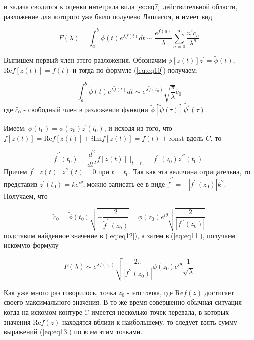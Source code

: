 \documentclass[14pt]{extarticle}
\renewcommand{\Re}{\mathrm{Re}}
\renewcommand{\Im}{\mathrm{Im}}
\newcommand{\const}{\mathrm{const}}
\begin{document}
и задача сводится к оценки интеграла вида $\ref{eq:eq7}$ действительной области, разложение для которого уже было получено Лапласом, и имеет вид\cite{Lavrentyev}

$$
F(\lambda) = \int_{a}^{b}\phi(t)e^{\lambda f(t)}dt \sim \frac{e^{f(a)}}{\lambda}\sum_{n=0}^{\infty}\frac{n! c_n}{\lambda^n}
$$
  
Выпишем первый член этого разложения. Обозначим $\phi[z(t)]z^\prime = \widetilde{\phi}(t)$, $\Re f[z(t)] = \widetilde{f}(t)$ и тогда по формуле (\ref{eq:eq10}) получаем:

\begin{equation}\label{eq:eq12}
\int_{a}^{b} \widetilde{\phi}(t) e^{\lambda \widetilde{f}(t)}dt \sim e^{\lambda \widetilde{f}(t_0)} \sqrt{\frac{\pi}{\lambda}} \widetilde{c_0}
\end{equation}
где $\widetilde{c_0}$ - свободный член в разложении функции $\widetilde{\phi}[\widetilde{\psi}(\tau)]\widetilde{\psi^\prime}(\tau)$.

Имеем: $\widetilde{\phi}(t_0) = \phi(z_0) z^\prime (t_0)$, и исходя из того, что $f[z(t)] = \Re f[z(t)]+ i \Im f[z(t)] = \widetilde{f}(t)+\const$ вдоль $\widetilde{C}$, то

\begin{equation}\nonumber
\widetilde{f}^{\prime\prime} (t_0) = \frac{d^2}{d t^2} f[z(t)]\;|_{t=t_0} = f^{\prime\prime} (z_0) z^{\prime^2} (t_0).
\end{equation}
Причем $f^\prime[z(t)] z^{\prime \prime} (t) = 0$ при $t=t_0$. Так как эта величина отрицательна, то представив $z^\prime (t_0) = k e^{i \theta}$, можно записать ее в виде $\widetilde{f}^{\prime\prime}=-|f^{\prime\prime}(z_0)| k^2$. Получаем, что 

\begin{equation}\nonumber
\widetilde{c}_0=\widetilde{\phi}(t_0) \sqrt{-\frac{2}{\widetilde{f}^{\prime\prime}(z_0)}}= \phi (z_0) e^{i \theta} \sqrt{\frac{2}{|f^{\prime\prime}(z_0)|}}
\end{equation}
подставим найденное значение в (\ref{eq:eq12}), а затем в (\ref{eq:eq11}), получаем искомую формулу

\begin{equation}\label{eq:eq13}
F(\lambda) \sim e^{\lambda f (z_0)}\sqrt{\frac{2\pi}{|f^{\prime \prime} (z_0)|}} \phi(z_0) e^{i \theta} \frac{1}{\sqrt{\lambda}}
\end{equation}

Как уже много раз говорилось, точка $z_0$ - это точка, где $\Re f(z)$ достигает своего максимального значения. В то же время совершенно обычная ситуация - когда на искомом контуре $\widetilde{C}$ имеется несколько точек перевала, в которых значения $\Re f (z)$ находятся вблизи к наибольшему, то следует взять сумму выражений (\ref{eq:eq13}) по всем этим точками. 
\end{document}
